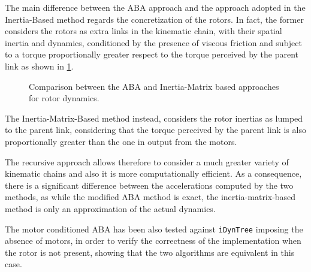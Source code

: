 The main difference between the \ac{ABA} approach and the approach adopted in the Inertia-Based method regards the concretization of the rotors. In fact, the former considers the rotors as extra links in the kinematic chain, with their spatial inertia and dynamics, conditioned by the presence of viscous friction and subject to a torque proportionally greater respect to the torque perceived by the parent link as shown in \cref{fig:ABA_comparison}.

\begin{figure}
    \centering
    \caption{Comparison between the ABA and Inertia-Matrix based approaches for rotor dynamics.}
    \label{fig:ABA_comparison}
    \subfloat[ABA]{
        \resizebox{0.5\textwidth}{!}{
            
        }}
\end{figure}

The Inertia-Matrix-Based method instead, considers the rotor inertias as lumped to the parent link, considering that the torque perceived by the parent link is also proportionally greater than the one in output from the motors.

The recursive approach allows therefore to consider a much greater variety of kinematic chains and also it is more computationally efficient. As a consequence, there is a significant difference between the accelerations computed by the two methods, as while the modified ABA method is exact, the inertia-matrix-based method is only an approximation of the actual dynamics.

The motor conditioned ABA has been also tested against \texttt{iDynTree} \citep{10.3389/frobt.2015.00006} imposing the absence of motors, in order to verify the correctness of the implementation when the rotor is not present, showing that the two algorithms are equivalent in this case.
